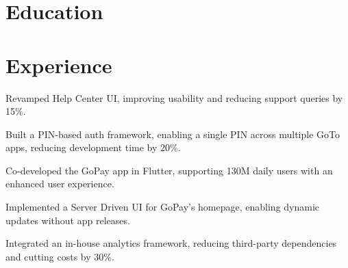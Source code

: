 \documentclass[]{deedy-resume-openfont}
\begin{document}
%
%


\section{Education} 


\sectionsep
{}


\section{Experience}
\textbf{\href{https://www.gojek.io/}{}} 
\begin{tightemize}
    \item Revamped Help Center UI, improving usability and reducing support queries by 15\%.
    \item Built a PIN-based auth framework, enabling a single PIN across multiple GoTo apps, reducing development time by 20\%.
    \item Co-developed the GoPay app in Flutter, supporting 130M daily users with an enhanced user experience.
    \item Implemented a Server Driven UI for GoPay's homepage, enabling dynamic updates without app releases.
    \item Integrated an in-house analytics framework, reducing third-party dependencies and cutting costs by 30\%.
\end{tightemize}
\sectionsep
\end{document}
